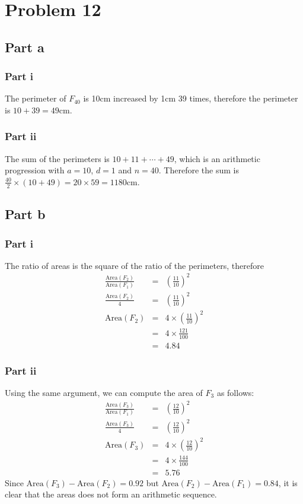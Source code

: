 \section*{Problem 12}
\subsection*{Part a}
\subsubsection*{Part i}
The perimeter of $ F_{40} $ is 10cm increased by 1cm 39 times, therefore the perimeter is $ 10 + 39 = 49 $cm.

\subsubsection*{Part ii}
The sum of the perimeters is $ 10 + 11 + \cdots + 49 $, which is an arithmetic progression with $ a = 10 $, $ d = 1 $ and $ n = 40 $. Therefore the sum is $ \frac{40}{2} \times (10 + 49) = 20 \times 59 = 1180 $cm.

\subsection*{Part b}
\subsubsection*{Part i}
The ratio of areas is the square of the ratio of the perimeters, therefore
\begin{eqnarray*}
    \frac{\text{Area}(F_2)}{\text{Area}(F_1)} &=& \left(\frac{11}{10}\right)^2 \\
    \frac{\text{Area}(F_2)}{4} &=& \left(\frac{11}{10}\right)^2 \\
    \text{Area}(F_2) &=& 4 \times \left(\frac{11}{10}\right)^2 \\
                     &=& 4 \times \frac{121}{100} \\
                     &=& 4.84
\end{eqnarray*}
\subsubsection*{Part ii}
Using the same argument, we can compute the area of $ F_3 $ as follows:
\begin{eqnarray*}
    \frac{\text{Area}(F_3)}{\text{Area}(F_1)} &=& \left(\frac{12}{10}\right)^2 \\
    \frac{\text{Area}(F_3)}{4} &=& \left(\frac{12}{10}\right)^2 \\
    \text{Area}(F_3) &=& 4 \times \left(\frac{12}{10}\right)^2 \\
                     &=& 4 \times \frac{144}{100} \\
                     &=& 5.76
\end{eqnarray*}
Since $ \text{Area}(F_3) - \text{Area}(F_2) = 0.92 $ but $ \text{Area}(F_2) - \text{Area}(F_1) = 0.84 $, it is clear that the areas does not form an arithmetic sequence.

